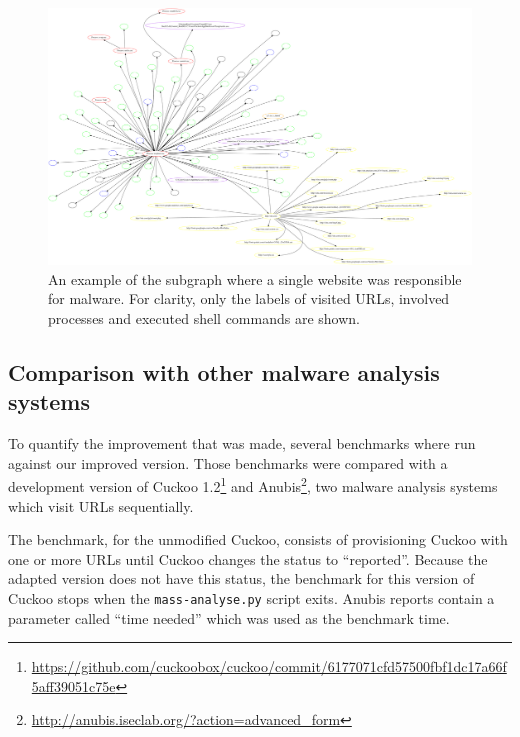 \pagebreak

\begin{figure}[h]
    \centering
    \includegraphics[width=25cm, angle=90]{Images/report_Subprocess_from_tab}
    \caption{An example of the subgraph where a single website was responsible for malware. For clarity, only the labels of visited URLs, involved processes and executed shell commands are shown.}
    \label{fig:subgraph}
\end{figure}

\pagebreak

\restoregeometry
{}
\setcounter{page}{\thesavepage}

\subsection{Comparison with other malware analysis systems}

To quantify the improvement that was made, several benchmarks where run against our improved version. Those benchmarks were compared with a development version of Cuckoo 1.2\footnote{\url{https://github.com/cuckoobox/cuckoo/commit/6177071cfd57500fbf1dc17a66f5aff39051c75e}} and Anubis\footnote{\url{http://anubis.iseclab.org/?action=advanced\_form}}, two malware analysis systems which visit URLs sequentially.%

The benchmark, for the unmodified Cuckoo, consists of provisioning Cuckoo with one or more URLs until Cuckoo changes the status to ``reported''. Because the adapted version does not have this status, the benchmark for this version of Cuckoo stops when the \texttt{mass-analyse.py} script exits. Anubis reports contain a parameter called ``time needed'' which was used as the benchmark time.

